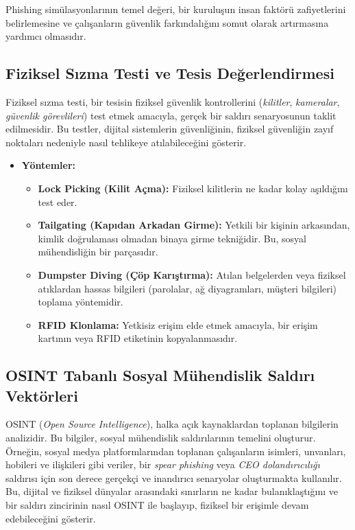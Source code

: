 Phishing simülasyonlarının temel değeri, bir kuruluşun insan faktörü zafiyetlerini belirlemesine ve çalışanların güvenlik farkındalığını somut olarak artırmasına yardımcı olmasıdır.

\subsection{Fiziksel Sızma Testi ve Tesis Değerlendirmesi}

Fiziksel sızma testi, bir tesisin fiziksel güvenlik kontrollerini (\textit{kilitler}, \textit{kameralar}, \textit{güvenlik görevlileri}) test etmek amacıyla, gerçek bir saldırı senaryosunun taklit edilmesidir. Bu testler, dijital sistemlerin güvenliğinin, fiziksel güvenliğin zayıf noktaları nedeniyle nasıl tehlikeye atılabileceğini gösterir.

\begin{itemize}
\item \textbf{Yöntemler:}
\begin{itemize}
\item \textbf{Lock Picking (Kilit Açma):} Fiziksel kilitlerin ne kadar kolay aşıldığını test eder.
\item \textbf{Tailgating (Kapıdan Arkadan Girme):} Yetkili bir kişinin arkasından, kimlik doğrulaması olmadan binaya girme tekniğidir. Bu, sosyal mühendisliğin bir parçasıdır.
\item \textbf{Dumpster Diving (Çöp Karıştırma):} Atılan belgelerden veya fiziksel atıklardan hassas bilgileri (parolalar, ağ diyagramları, müşteri bilgileri) toplama yöntemidir.
\item \textbf{RFID Klonlama:} Yetkisiz erişim elde etmek amacıyla, bir erişim kartının veya RFID etiketinin kopyalanmasıdır.
\end{itemize}
\end{itemize}

\subsection{OSINT Tabanlı Sosyal Mühendislik Saldırı Vektörleri}

OSINT (\textit{Open Source Intelligence}), halka açık kaynaklardan toplanan bilgilerin analizidir. Bu bilgiler, sosyal mühendislik saldırılarının temelini oluşturur. Örneğin, sosyal medya platformlarından toplanan çalışanların isimleri, unvanları, hobileri ve ilişkileri gibi veriler, bir \textit{spear phishing} veya \textit{CEO dolandırıcılığı} saldırısı için son derece gerçekçi ve inandırıcı senaryolar oluşturmakta kullanılır. Bu, dijital ve fiziksel dünyalar arasındaki sınırların ne kadar bulanıklaştığını ve bir saldırı zincirinin nasıl OSINT ile başlayıp, fiziksel bir erişimle devam edebileceğini gösterir.

